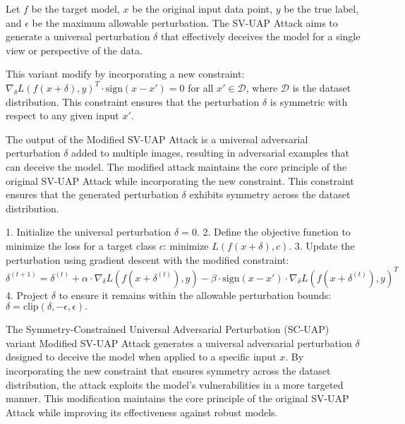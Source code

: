 Let \( f \) be the target model, \( x \) be the original input data point, \( y \) be the true label, and \( \epsilon \) be the maximum allowable perturbation. The SV-UAP Attack aims to generate a universal perturbation \( \delta \) that effectively deceives the model for a single view or perspective of the data.

This variant modify by incorporating a new constraint: \( \nabla_{\delta} L(f(x + \delta), y)^T \cdot \text{sign}(x - x') = 0 \) for all \( x' \in \mathcal{D} \), where \( \mathcal{D} \) is the dataset distribution. This constraint ensures that the perturbation \( \delta \) is symmetric with respect to any given input \( x' \).

The output of the Modified SV-UAP Attack is a universal adversarial perturbation \( \delta \) added to multiple images, resulting in adversarial examples that can deceive the model. The modified attack maintains the core principle of the original SV-UAP Attack while incorporating the new constraint. This constraint ensures that the generated perturbation \( \delta \) exhibits symmetry across the dataset distribution.

1. Initialize the universal perturbation \( \delta = 0 \).
2. Define the objective function to minimize the loss for a target class \( c \):
   $
   \text{minimize } L(f(x + \delta), c).
   $
3. Update the perturbation using gradient descent with the modified constraint:
   $
   \delta^{(t+1)} = \delta^{(t)} + \alpha \cdot \nabla_{\delta} L(f(x + \delta^{(t)}), y) - \beta \cdot \text{sign}(x - x') \cdot \nabla_{\delta} L(f(x + \delta^{(t)}), y)^T
   $
4. Project \( \delta \) to ensure it remains within the allowable perturbation bounds:
   $
   \delta = \text{clip}(\delta, -\epsilon, \epsilon).
   $

The Symmetry-Constrained Universal Adversarial Perturbation (SC-UAP) variant Modified SV-UAP Attack generates a universal adversarial perturbation \( \delta \) designed to deceive the model when applied to a specific input \( x \). By incorporating the new constraint that ensures symmetry across the dataset distribution, the attack exploits the model's vulnerabilities in a more targeted manner. This modification maintains the core principle of the original SV-UAP Attack while improving its effectiveness against robust models.